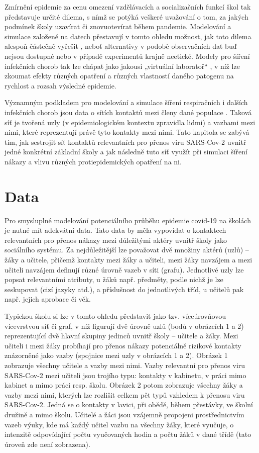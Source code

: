 Zmírnění epidemie za cenu omezení vzdělávacích a socializačních funkcí škol tak představuje určité dilema, s nímž se potýká veškeré uvažování o tom, za jakých podmínek školy uzavírat či znovuotevírat během pandemie. Modelování a simulace založené na datech přestavují v tomto ohledu možnost, jak toto dilema alespoň částečně vyřešit \cite{squazzoni2020computational}, neboť alternativy v podobě observačních dat buď nejsou dostupné nebo v případě experimentů krajně neetické. Modely pro šíření infekčních chorob tak lze chápat jako jakousi „virtuální laboratoř“ \cite{Rao_etal2021}, v níž lze zkoumat efekty různých opatření a různých vlastností daného patogenu na rychlost a rozsah výsledné epidemie.

Významným podkladem pro modelování a simulace šíření respiračních i dalších infekčních chorob jsou data o sítích kontaktů mezi členy dané populace \cite{danon2011networks, luke2007network, zaj:mossong2008social}. Taková síť je tvořená uzly (v epidemiologickém kontextu zpravidla lidmi) a vazbami mezi nimi, které reprezentují právě tyto kontakty mezi nimi. Tato kapitola se zabývá tím, jak sestrojit síť kontaktů relevantních pro přenos viru SARS-Cov-2 uvnitř jedné konkrétní základní školy a jak následně tuto síť využít při simulaci šíření nákazy a vlivu různých protiepidemických opatření na ni. 


\section*{Data} 
Pro smysluplné modelování potenciálního průběhu epidemie covid-19 na školách je nutné mít adekvátní data. Tato data by měla vypovídat o kontaktech relevantních pro přenos nákazy mezi důležitými aktéry uvnitř školy jako sociálního systému. Za nejdůležitější lze považovat dvě množiny aktérů (uzlů) – žáky a učitele, přičemž kontakty mezi žáky a učiteli, mezi žáky navzájem a mezi učiteli navzájem definují různé úrovně vazeb v síti (grafu). Jednotlivé uzly lze popsat relevantními atributy, u žáků např. předměty, podle nichž je lze seskupovat (cizí jazyky atd.), a příslušnost do jednotlivých tříd, u učitelů pak např. jejich aprobace či věk. 

Typickou školu si lze v tomto ohledu představit jako tzv. víceúrovňovou vícevrstvou síť či graf, v níž figurují dvě úrovně uzlů (bodů v obrázcích 1 a 2) reprezentující dvě hlavní skupiny jedinců uvnitř školy – učitele a žáky. Mezi učiteli i mezi žáky probíhají pro přenos nákazy potenciálně rizikové kontakty znázorněné jako vazby (spojnice mezi uzly v obrázcích 1 a 2). Obrázek 1 zobrazuje všechny učitele a vazby mezi nimi. Vazby relevantní pro přenos viru SARS-Cov-2 mezi učiteli jsou trojího typu: kontakty v kabinetu, v práci mimo kabinet a mimo práci resp. školu. Obrázek 2 potom zobrazuje všechny žáky a vazby mezi nimi, kterých lze rozlišit celkem pět typů vzhledem k přenosu viru SARS-Cov-2. Jedná se o kontakty v lavici, při obědě, během přestávky, ve školní družině a mimo školu. Učitelé a žáci jsou vzájemně propojeni prostřednictvím vazeb výuky, kde má každý učitel vazbu na všechny žáky, které vyučuje, o intenzitě odpovídající počtu vyučovaných hodin a počtu žáků v dané třídě (tato úroveň zde není zobrazena).

